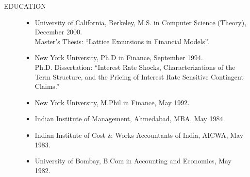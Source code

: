 \documentclass{article}
\begin{document}
\begin{description}
\item[EDUCATION] \mbox{}

\begin{itemize}
\setlength\itemsep{-0.1em}

\item University of California, Berkeley, M.S. in Computer Science (Theory),
December 2000. \\
Master's Thesis: ``Lattice Excursions in Financial Models''.
  
\item New York University, Ph.D in Finance, September 1994.\\
Ph.D. Dissertation: ``Interest Rate Shocks, Characterizations of the Term
Structure, and the Pricing of Interest Rate Sensitive Contingent
Claims.''

\item New York University, M.Phil in Finance, May 1992.

\item Indian Institute of Management, Ahmedabad, MBA, May 1984.

\item Indian Institute of Cost \& Works Accountants of India, AICWA, May 1983.

\item University of Bombay, B.Com in Accounting and Economics, May 1982.

\end{itemize}

\end{description}
\end{document}
